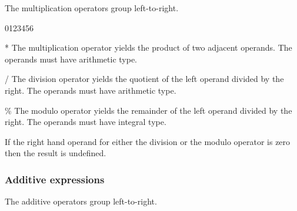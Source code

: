 The multiplication operators group left-to-right.

\begin{production}
\end{production}


\begin{production}
\begin{Ventry3}{0123456}
\item[*]        The multiplication operator yields the product of two
                adjacent operands. The operands must have arithmetic type.
\item[/]        The division operator yields the quotient of the left
                operand divided by the right.  The operands must have
                arithmetic type.
\item[\%]       The modulo operator yields the remainder 
                of the left operand divided by the right. The operands
                must have integral type.
\end{Ventry3}
\end{production}

If the right hand operand for either the division or the modulo operator
is zero then the result is undefined.





\subsubsection{Additive expressions}
\label{sec:AddExpression}

The additive operators group left-to-right. 

\begin{production}
\end{production}

